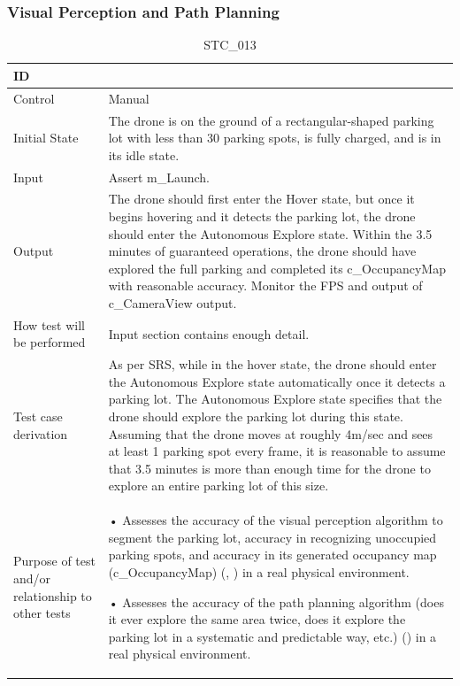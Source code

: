 \documentclass[12pt, titlepage]{article}
\begin{document}
\clearpage

\subsubsection{Visual Perception and Path Planning}

\begin{table}[!h]
\begin{center}
\caption {STC\_013}
\label{tab:STC_013}
\begin{tabular}{ | m{1.5cm} | m{15cm} | } 
\hline
ID & \nameref{tab:STC_013} \\ 
\hline
Control & Manual \\ 
\hline
Initial State & The drone is on the ground of a rectangular-shaped parking lot with less than 30 parking spots, is fully charged, and is in its idle state.  \\ 
\hline
Input & Assert m\_Launch. \\ 
\hline
Output & The drone should first enter the Hover state, but once it begins hovering and it detects the parking lot, the drone should enter the Autonomous Explore state. Within the 3.5 minutes of guaranteed operations, the drone should have explored the full parking and completed its c\_OccupancyMap with reasonable accuracy. 
Monitor the FPS and output of c\_CameraView output. \\ 
\hline
How test will be performed & Input section contains enough detail. \\ 
\hline
Test case derivation & As per SRS, while in the hover state, the drone should enter the Autonomous Explore state automatically once it detects a parking lot. The Autonomous Explore state specifies that the drone should explore the parking lot during this state. Assuming that the drone moves at roughly 4m/sec and sees at least 1 parking spot every frame, it is reasonable to assume that 3.5 minutes is more than enough time for the drone to explore an entire parking lot of this size.
 \\ 
\hline
Purpose of test and/or relationship to other tests & 
\item • Assesses the accuracy of the visual perception algorithm to segment the parking lot, accuracy in recognizing unoccupied parking spots, and accuracy in its generated occupancy map (c\_OccupancyMap) (\nameref{GEN_005}, \nameref{GEN_006}) in a real physical environment.

• Assesses the accuracy of the path planning algorithm (does it ever explore the same area twice, does it explore the parking lot in a systematic and predictable way, etc.) (\nameref{STA_003}) in a real physical environment.


\end{tabular}
\end{center}
\end{table}
\end{document}
